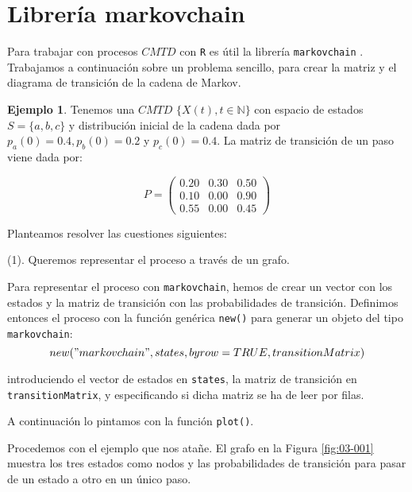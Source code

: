 \documentclass[
]{book}
\newenvironment{whitebox}{
  \definecolor{shadecolor}{rgb}{255, 255, 255}  
  \color{black}
  \begin{shaded}}
 {\end{shaded}}
\theoremstyle{definition}
\theoremstyle{definition}
\newtheorem{example}{Ejemplo}[chapter]
\theoremstyle{definition}
\theoremstyle{definition}
\theoremstyle{remark}
\begin{document}
\hypertarget{libMC}{%
\section{Librería markovchain}\label{libMC}}

Para trabajar con procesos \(CMTD\) con \texttt{R} es útil la librería \texttt{markovchain} \citep{R-markovchain}. Trabajamos a continuación sobre un problema sencillo, para crear la matriz y el diagrama de transición de la cadena de Markov.

\begin{example}
\protect\hypertarget{exm:diagramCMTD}{}\label{exm:diagramCMTD}Tenemos una \(CMTD\) \(\{X(t), t \in \mathbb{N}\}\) con espacio de estados \(S = \{a, b, c\}\) y distribución inicial de la cadena dada por \(p_a(0)=0.4, p_b(0)=0.2\) y \(p_c(0)=0.4\). La matriz de transición de un paso viene dada por:

\[P = 
\begin{pmatrix}
0.20 & 0.30 & 0.50\\
0.10 & 0.00 & 0.90\\
0.55 & 0.00 & 0.45
\end{pmatrix}\]
\end{example}

Planteamos resolver las cuestiones siguientes:

(1). Queremos representar el proceso a través de un grafo.

\begin{whitebox}
Para representar el proceso con \texttt{markovchain}, hemos de crear un vector con los estados y la matriz de transición con las probabilidades de transición. Definimos entonces el proceso con la función genérica \texttt{new()} para generar un objeto del tipo \texttt{markovchain}: \[new("markovchain",states,byrow=TRUE,transitionMatrix)\]

introduciendo el vector de estados en \texttt{states}, la matriz de transición en \texttt{transitionMatrix}, y especificando si dicha matriz se ha de leer por filas.

A continuación lo pintamos con la función \texttt{plot()}.

\end{whitebox}

Procedemos con el ejemplo que nos atañe. El grafo en la Figura \ref{fig:03-001} muestra los tres estados como nodos y las probabilidades de transición para pasar de un estado a otro en un único paso.
\end{document}
